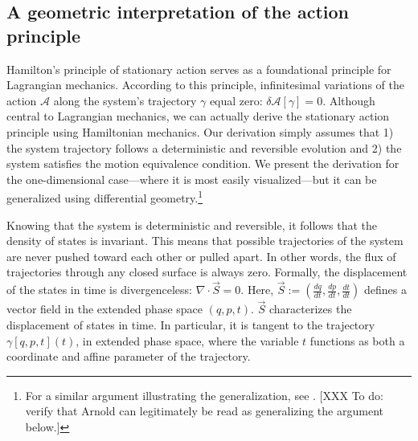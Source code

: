 \documentclass[letterpaper]{article}
\renewcommand{\vector}[1]{\ensuremath{\vec{#1}}} %
\begin{document}
\subsection{A geometric interpretation of the action principle}
\label{action}



Hamilton's principle of stationary action serves as a foundational principle for Lagrangian mechanics. According to this principle, infinitesimal variations of the action $ \mathscr{A}$ along the system's trajectory $\gamma $ equal zero: $\delta  \mathscr{A}[\gamma] = 0 $. Although central to Lagrangian mechanics, we can actually derive the stationary action principle using Hamiltonian mechanics. Our derivation simply assumes that 1) the system trajectory follows a deterministic and reversible evolution and 2) the system satisfies the motion equivalence condition. We present the derivation for the one-dimensional case---where it is most easily visualized---but it can be generalized using differential geometry.\footnote{For a similar argument illustrating the generalization, see \textcites[110]{Arnold}. [XXX To do: verify that Arnold can legitimately be read as generalizing the argument below.]}

Knowing that the system is deterministic and reversible, it follows that the density of states is invariant. This means that possible trajectories of the system are never pushed toward each other or pulled apart. In other words, the flux of trajectories through any closed surface is always zero. Formally, the displacement of the states in time is divergenceless: $\nabla \cdot \vector{S} = 0 $. Here, $\vec{S} := (\frac{d q }{d t }, \frac{d p }{d t }, \frac{d t }{d t })$ defines a vector field in the extended phase space $(q, p , t ) $. $\vector{S}$ characterizes the displacement of states in time. In particular, it is tangent to the trajectory $\gamma [q, p, t] (t)$, in extended phase space, where the variable $t$ functions as both a coordinate and affine parameter of the trajectory. 
\end{document}

